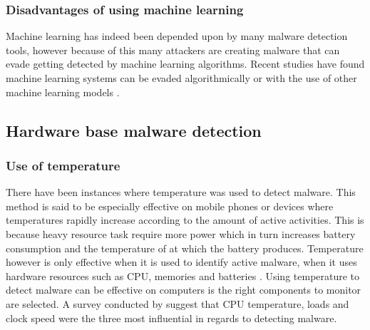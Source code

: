 \documentclass[progress]{cmpreport}
\begin{document}
		\subsubsection{Disadvantages of using machine learning}
			Machine learning has indeed been depended upon by many malware detection tools, however because of this many attackers are creating malware that can evade getting detected by machine learning algorithms. Recent studies have found machine learning systems can be evaded algorithmically or with the use of other machine learning models \citep{Anderson}.
		
		\subsection{Hardware base malware detection}	
		
		\subsubsection{Use of temperature}
			There have been instances where temperature was used to detect malware. This method is said to be especially effective on mobile phones or devices where temperatures rapidly increase according to the amount of active activities. This is because heavy resource task require more power which in turn increases battery consumption and the temperature of at which the battery produces. Temperature however is only effective when it is used to identify active malware, when it uses hardware resources such as CPU, memories and batteries \citep{7352512}. Using temperature to detect malware can be effective on computers is the right components to monitor are selected. A survey conducted by \cite{larsen2021survey} suggest that CPU temperature, loads and clock speed were the three most influential in regards to detecting malware.  
		
\end{document}
